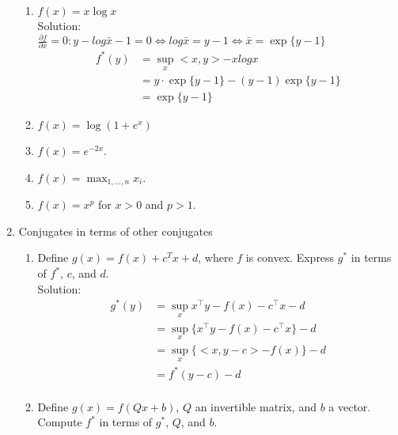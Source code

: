 \documentclass[12pt]{amsart}
\begin{document}
\begin{enumerate}
\begin{enumerate}
\item $f(x) = x\log x$\\

\noindent
Solution:\\
$\frac{\partial f}{\partial x} = 0: y - log \bar{x} - 1 = 0 \Leftrightarrow log \bar{x} = y-1 \Leftrightarrow \bar{x} = \exp\{y-1\}$\\
\begin{align*}
f^*(y) &= \sup_x <x,y> - x log x \\
         &= y \cdot \exp\{y-1\} - (y-1) \exp\{y-1\} \\
	 &= \exp\{y-1\}
\end{align*}

\item $f(x) = \log(1 + e^x)$\\

\item $f(x) = e^{-2x}$.\\

\item $f(x) = \max_{1, \dots, n} x_i$. \\

\item $f(x) = x^p$ for $x > 0$ and $p > 1$. \\

\end{enumerate}

\item Conjugates in terms of other conjugates

\begin{enumerate}

\item Define $g(x) = f(x) + c^Tx + d$, where $f$ is convex. Express $g^*$ in terms of $f^*$, $c$, and $d$. \\

\noindent
Solution:
\begin{align*}
g^*(y) &= \sup_x x^\top y - f(x) - c^\top x - d \\
          &= \sup_x \{x^\top y - f(x) - c^\top x\} -d\\
	  &= \sup_x \{<x, y-c> - f(x)\} - d\\
          &= f^*(y-c) -d \\
\end{align*}

\item Define $g(x) = f(Qx + b)$, $Q$ an invertible matrix, and $b$ a vector. Compute $f^*$ in terms of $g^*$, $Q$, and $b$.\\


\end{enumerate}
\end{enumerate}
\end{document}
